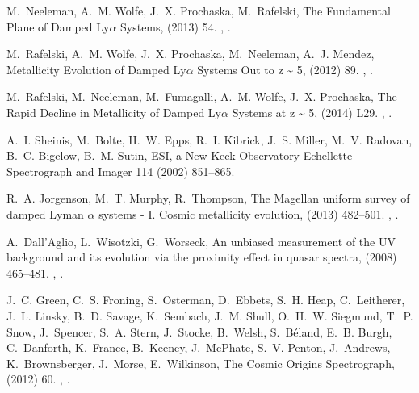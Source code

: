 \documentclass[12pt]{elsarticle}
\begin{document}
\begin{thebibliography}{10}
M.~{Neeleman}, A.~M. {Wolfe}, J.~X. {Prochaska}, M.~{Rafelski}, {The
  Fundamental Plane of Damped Ly{$\alpha$} Systems},  (2013) 54.
\newblock \href {http://arxiv.org/abs/1303.7239} {},
  \href {http://dx.doi.org/10.1088/0004-637X/769/1/54}
  {}.

M.~{Rafelski}, A.~M. {Wolfe}, J.~X. {Prochaska}, M.~{Neeleman}, A.~J. {Mendez},
  {Metallicity Evolution of Damped Ly{$\alpha$} Systems Out to z \~{} 5},  (2012) 89.
\newblock \href {http://arxiv.org/abs/1205.5047} {},
  \href {http://dx.doi.org/10.1088/0004-637X/755/2/89}
  {}.

M.~{Rafelski}, M.~{Neeleman}, M.~{Fumagalli}, A.~M. {Wolfe}, J.~X. {Prochaska},
  {The Rapid Decline in Metallicity of Damped Ly{$\alpha$} Systems at z \~{}
  5},  (2014) L29.
\newblock \href {http://arxiv.org/abs/1310.6042} {},
  \href {http://dx.doi.org/10.1088/2041-8205/782/2/L29}
  {}.

A.~I. {Sheinis}, M.~{Bolte}, H.~W. {Epps}, R.~I. {Kibrick}, J.~S. {Miller},
  M.~V. {Radovan}, B.~C. {Bigelow}, B.~M. {Sutin}, {ESI, a New Keck Observatory
  Echellette Spectrograph and Imager} 114 (2002) 851--865.

R.~A. {Jorgenson}, M.~T. {Murphy}, R.~{Thompson}, {The Magellan uniform survey
  of damped Lyman {$\alpha$} systems - I. Cosmic metallicity evolution},  (2013) 482--501.
\newblock \href {http://arxiv.org/abs/1307.4429} {},
  \href {http://dx.doi.org/10.1093/mnras/stt1309}
  {}.

A.~{Dall'Aglio}, L.~{Wisotzki}, G.~{Worseck}, {An unbiased measurement of the
  UV background and its evolution via the proximity effect in quasar spectra},
   (2008) 465--481.
\newblock \href {http://arxiv.org/abs/0807.5089} {},
  \href {http://dx.doi.org/10.1051/0004-6361:200810724}
  {}.

J.~C. {Green}, C.~S. {Froning}, S.~{Osterman}, D.~{Ebbets}, S.~H. {Heap},
  C.~{Leitherer}, J.~L. {Linsky}, B.~D. {Savage}, K.~{Sembach}, J.~M. {Shull},
  O.~H.~W. {Siegmund}, T.~P. {Snow}, J.~{Spencer}, S.~A. {Stern}, J.~{Stocke},
  B.~{Welsh}, S.~{B{\'e}land}, E.~B. {Burgh}, C.~{Danforth}, K.~{France},
  B.~{Keeney}, J.~{McPhate}, S.~V. {Penton}, J.~{Andrews}, K.~{Brownsberger},
  J.~{Morse}, E.~{Wilkinson}, {The Cosmic Origins Spectrograph}, 
  (2012) 60.
\newblock \href {http://arxiv.org/abs/1110.0462} {},
  \href {http://dx.doi.org/10.1088/0004-637X/744/1/60}
  {}.


\end{thebibliography}
\end{document}
